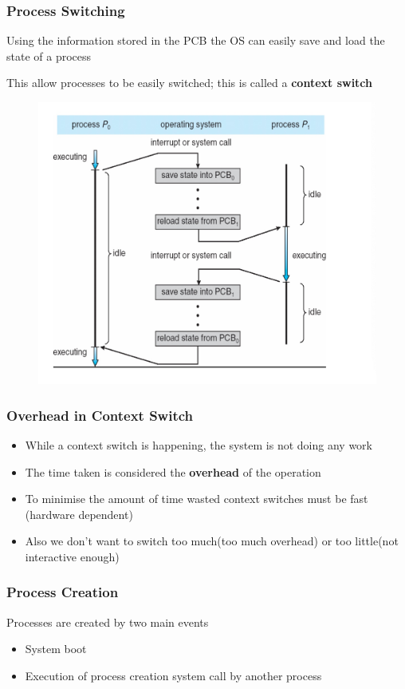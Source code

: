 \documentclass[11pt]{article}
\theoremstyle{definition}
\begin{document}
        \subsubsection{Process Switching}
            \item Using the information stored in the PCB the OS can easily save and load the state of a process
            \item This allow processes to be easily switched; this is called a \textbf{context switch}
        \begin{figure}[htbp]
            \centering
                \includegraphics[width=0.68\linewidth]{Operating System/img/Process_Switching.jpg}
                \label{fig:enter-label}
        \end{figure}
        \subsubsection{Overhead in Context Switch}
            \begin{itemize}
                \item While a context switch is happening, the system is not doing any work
                \item The time taken is considered the \textbf{overhead} of the operation
                \item To minimise the amount of time wasted context switches must be fast (hardware dependent)
                \item Also we don't want to switch too much(too much overhead) or too little(not interactive enough)
            \end{itemize}
        \subsubsection{Process Creation}
        Processes are created by two main events
        \begin{itemize}
            \item System boot
            \item Execution of process creation system call by another process
        \end{itemize}
\end{document}
